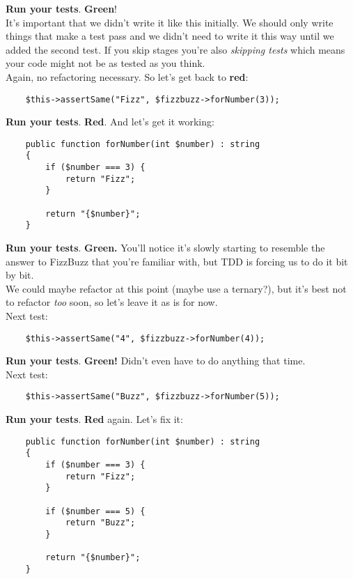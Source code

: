 \textbf{Run your tests}. \textbf{Green}!
\\

It's important that we didn't write it like this initially. We should only write things that make a test pass and we didn't need to write it this way until we added the second test. If you skip stages you're also \textit{skipping tests} which means your code might not be as tested as you think.
\\

Again, no refactoring necessary. So let's get back to \textbf{red}:

\begin{verbatim}
    $this->assertSame("Fizz", $fizzbuzz->forNumber(3));
\end{verbatim}

\textbf{Run your tests}. \textbf{Red}. And let's get it working:

\begin{verbatim}
    public function forNumber(int $number) : string
    {
        if ($number === 3) {
            return "Fizz";
        }

        return "{$number}";
    }
\end{verbatim}

\textbf{Run your tests}. \textbf{Green.} You'll notice it's slowly starting to resemble the answer to FizzBuzz that you're familiar with, but TDD is forcing us to do it bit by bit.
\\

We could maybe refactor at this point (maybe use a ternary?), but it's best not to refactor \textit{too} soon, so let's leave it as is for now.
\\

Next test:

\begin{verbatim}
    $this->assertSame("4", $fizzbuzz->forNumber(4));
\end{verbatim}

\textbf{Run your tests}. \textbf{Green!} Didn't even have to do anything that time.
\\

Next test:

\begin{verbatim}
    $this->assertSame("Buzz", $fizzbuzz->forNumber(5));
\end{verbatim}

\textbf{Run your tests}. \textbf{Red} again. Let's fix it:

\begin{verbatim}
    public function forNumber(int $number) : string
    {
        if ($number === 3) {
            return "Fizz";
        }

        if ($number === 5) {
            return "Buzz";
        }

        return "{$number}";
    }
\end{verbatim}

